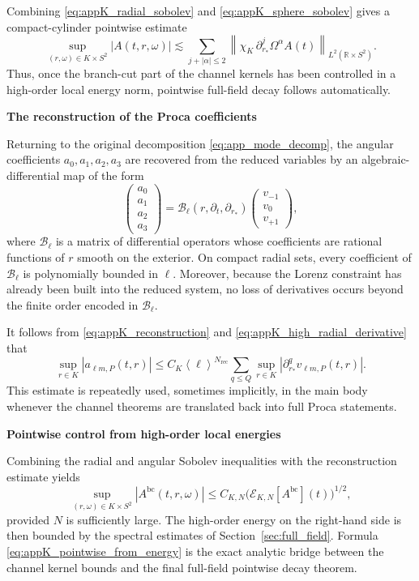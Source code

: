 \documentclass[12pt]{article}
\numberwithin{equation}{section}
\theoremstyle{plain}
\theoremstyle{definition}
\theoremstyle{remark}
\newcommand{\R}{\mathbb R}
\newcommand{\bc}{\mathrm{bc}}
\newcommand{\angles}[1]{\left\langle #1 \right\rangle}
\newcommand{\abs}[1]{\left|#1\right|}
\newcommand{\norm}[1]{\left\|#1\right\|}
\newcommand{\appheading}[1]{\par\medskip\noindent\textbf{#1}\par\smallskip\noindent}
\begin{document}
Combining \eqref{eq:appK_radial_sobolev} and \eqref{eq:appK_sphere_sobolev} gives a compact-cylinder pointwise estimate
\[
   \sup_{(r,\omega)\in K\times S^2}\abs{A(t,r,\omega)}
   \lesssim
   \sum_{j+|\alpha|\le2}
      \norm{\chi_K\,\partial_{r_*}^j\Omega^\alpha A(t)}_{L^2(\R\times S^2)}.
\]
Thus, once the branch-cut part of the channel kernels has been controlled in a high-order local energy norm, pointwise full-field decay follows automatically.

\appheading{The reconstruction of the Proca coefficients}

Returning to the original decomposition \eqref{eq:app_mode_decomp}, the angular coefficients $a_0,a_1,a_2,a_3$ are recovered from the reduced variables by an algebraic-differential map of the form
\begin{equation}\label{eq:appK_reconstruction}
   \begin{pmatrix}
      a_0\\ a_1\\ a_2\\ a_3
   \end{pmatrix}
   =
   \mathcal B_{\ell}(r,\partial_t,\partial_{r_*})
   \begin{pmatrix}
      v_{-1}\\ v_0\\ v_{+1}
   \end{pmatrix},
\end{equation}
where $\mathcal B_\ell$ is a matrix of differential operators whose coefficients are rational functions of $r$ smooth on the exterior.  On compact radial sets, every coefficient of $\mathcal B_\ell$ is polynomially bounded in $\ell$.  Moreover, because the Lorenz constraint has already been built into the reduced system, no loss of derivatives occurs beyond the finite order encoded in $\mathcal B_\ell$.

It follows from \eqref{eq:appK_reconstruction} and \eqref{eq:appK_high_radial_derivative} that
\[
   \sup_{r\in K}\abs{a_{\ell m,P}(t,r)}
   \le
   C_K\angles{\ell}^{N_{\mathrm{rec}}}
   \sum_{q\le Q}
      \sup_{r\in K}\abs{\partial_{r_*}^q v_{\ell m,P}(t,r)}.
\]
This estimate is repeatedly used, sometimes implicitly, in the main body whenever the channel theorems are translated back into full Proca statements.

\appheading{Pointwise control from high-order local energies}

Combining the radial and angular Sobolev inequalities with the reconstruction estimate yields
\begin{equation}\label{eq:appK_pointwise_from_energy}
   \sup_{(r,\omega)\in K\times S^2}\abs{A^{\bc}(t,r,\omega)}
   \le
   C_{K,N}
   \bigl(\mathcal E_{K,N}[A^{\bc}](t)\bigr)^{1/2},
\end{equation}
provided $N$ is sufficiently large.  The high-order energy on the right-hand side is then bounded by the spectral estimates of Section~\ref{sec:full_field}.  Formula \eqref{eq:appK_pointwise_from_energy} is the exact analytic bridge between the channel kernel bounds and the final full-field pointwise decay theorem.
\end{document}
